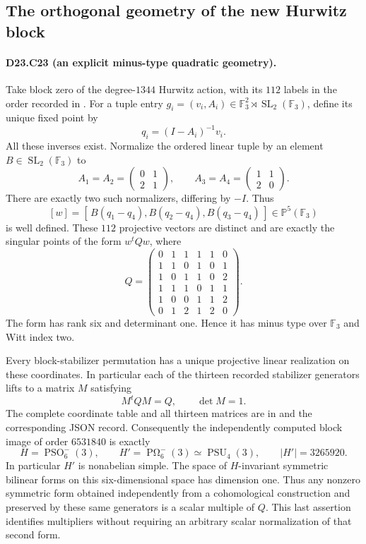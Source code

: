 \subsection{The orthogonal geometry of the new Hurwitz block}

\paragraph{D23.C23 (an explicit minus-type quadratic geometry).}
Take block zero of the degree-$1344$ Hurwitz action, with its
$112$ labels in the order recorded in
.
For a tuple entry $g_i=(v_i,A_i)\in
\mathbb F_3^2\rtimes\operatorname{SL}_2(\mathbb F_3)$, define
its unique fixed point by
\[
                     q_i=(I-A_i)^{-1}v_i.
\]
All these inverses exist. Normalize the ordered linear tuple by
an element $B\in\operatorname{SL}_2(\mathbb F_3)$ to
\[
 A_1=A_2=\begin{pmatrix}0&1\\2&1\end{pmatrix},\qquad
 A_3=A_4=\begin{pmatrix}1&1\\2&0\end{pmatrix}.
\tag{D23.C23.1}
\]
There are exactly two such normalizers, differing by $-I$.
Thus
\[
 [w]=[\,B(q_1-q_4),B(q_2-q_4),B(q_3-q_4)\,]
                  \in\mathbb P^5(\mathbb F_3)
\tag{D23.C23.2}
\]
is well defined. These $112$ projective vectors are distinct
and are exactly the singular points of the form $w^tQw$, where
\[
 Q=\begin{pmatrix}
 0&1&1&1&1&0\\
 1&1&0&1&0&1\\
 1&0&1&1&0&2\\
 1&1&1&0&1&1\\
 1&0&0&1&1&2\\
 0&1&2&1&2&0
 \end{pmatrix}.
\tag{D23.C23.3}
\]
The form has rank six and determinant one. Hence it has minus
type over $\mathbb F_3$ and Witt index two.

Every block-stabilizer permutation has a unique projective
linear realization on these coordinates. In particular each
of the thirteen recorded stabilizer generators lifts to a
matrix $M$ satisfying
\[
                         M^tQM=Q,\qquad\det M=1.
\tag{D23.C23.4}
\]
The complete coordinate table and all thirteen matrices are
in 
and the corresponding JSON record. Consequently the independently
computed block image of order $6531840$ is exactly
\[
 H=\operatorname{PSO}_6^-(3),\qquad
 H'=\operatorname{P\Omega}_6^-(3)\simeq
                  \operatorname{PSU}_4(3),
 \qquad |H'|=3265920.
\tag{D23.C23.5}
\]
In particular $H'$ is nonabelian simple. The space of
$H$-invariant symmetric bilinear forms on this six-dimensional
space has dimension one. Thus any nonzero symmetric form
obtained independently from a cohomological construction and
preserved by these same generators is a scalar multiple of $Q$.
This last assertion identifies multipliers without requiring
an arbitrary scalar normalization of that second form.


